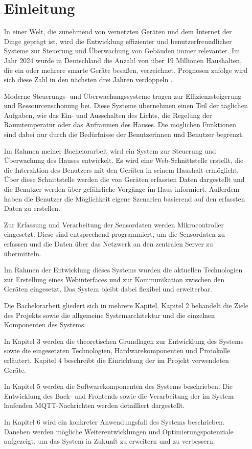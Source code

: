 \documentclass[12pt, letterpaper]{article}
\begin{document}
\section{Einleitung}
\par In einer Welt, die zunehmend von vernetzten Geräten und dem Internet der Dinge geprägt ist, wird die Entwicklung effizienter und benutzerfreundlicher Systeme zur Steuerung und Überwachung von Gebäuden immer relevanter. Im Jahr 2024 wurde in Deutschland die Anzahl von über 19 Millionen Haushalten, die ein oder mehrere smarte Geräte besaßen, verzeichnet. Prognosen zufolge wird sich diese Zahl in den nächsten drei Jahren verdoppeln \cite{statita_smhomes}.
\par Moderne Steuerungs- und Überwachungssysteme tragen zur Effizienzsteigerung und Ressourcenschonung bei. Diese Systeme übernehmen einen Teil der täglichen Aufgaben, wie das Ein- und Ausschalten des Lichts, die Regelung der Raumtemperatur oder das Aufräumen des Hauses. Die möglichen Funktionen sind dabei nur durch die Bedürfnisse der Benutzerinnen und Benutzer begrenzt.
\par Im Rahmen meiner Bachelorarbeit wird ein System zur Steuerung und Überwachung des Hauses entwickelt. Es wird eine Web-Schnittstelle erstellt, die die Interaktion des Benutzers mit den Geräten in seinem Haushalt ermöglicht. Über diese Schnittstelle werden die von Geräten erfassten Daten dargestellt und die Benutzer werden über gefährliche Vorgänge im Haus informiert. Außerdem haben die Benutzer die Möglichkeit eigene Szenarien basierend auf den erfassten Daten zu erstellen.
\par Zur Erfassung und Verarbeitung der Sensordaten werden Mikrocontroller eingesetzt. Diese sind entsprechend programmiert, um die Sensordaten zu erfassen und die Daten über das Netzwerk an den zentralen Server zu übermitteln.
\par Im Rahmen der Entwicklung dieses Systems wurden die aktuellen Technologien zur Erstellung eines Webinterfaces und zur Kommunikation zwischen den Geräten eingesetzt. Das System bleibt dabei flexibel und erweiterbar. 
\par Die Bachelorarbeit gliedert sich in mehrere Kapitel. Kapitel 2 behandelt die Ziele des Projekts sowie die allgemeine Systemarchitektur und die einzelnen Komponenten des Systems.
\par In Kapitel 3 werden die theoretischen Grundlagen zur Entwicklung des Systems sowie die eingesetzten Technologien, Hardwarekomponenten und Protokolle erläutert. Kapitel 4 beschreibt die Einrichtung der im Projekt verwendeten Geräte.
\par In Kapitel 5 werden die Softwarekomponenten des Systems beschrieben. Die Entwicklung des Back- und Frontends sowie die Verarbeitung der im System laufenden MQTT-Nachrichten werden detailliert dargestellt.
\par In Kapitel 6 wird ein konkreter Anwendungsfall des Systems beschrieben. Daneben werden mögliche Weiterentwicklungen und Optimierungspotenziale aufgezeigt, um das System in Zukunft zu erweitern und zu verbessern.
\newpage
\end{document}
